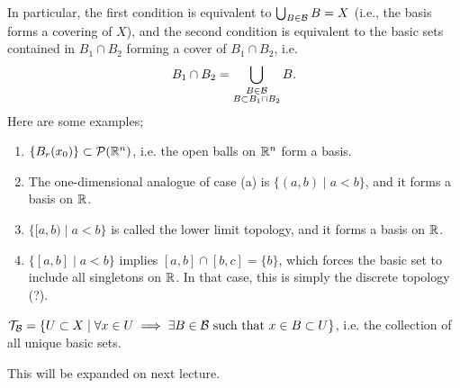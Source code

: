 \newpage
\noindent In particular, the first condition is equivalent to $\bigcup_{B \in \mathcal B} B = X$ (i.e., the basis forms a covering of $X$), and the second condition is equivalent to the basic sets contained in $B_1 \cap B_2$ forming a cover of $B_1 \cap B_2$, i.e.
\[ B_1 \cap B_2 = \bigcup_{\substack{B \in \mathcal B \\ B \subset B_1 \cap B_2}} B. \]
Here are some examples;
\begin{enumerate}[label=(\alph*)]
    \item $\{B_r(x_0)\} \subset \mathcal P(\mathbb R^n)$, i.e. the open balls on $\mathbb R^n$ form a basis.
    \item The one-dimensional analogue of case (a) is $\{(a, b) \mid a < b\}$, and it forms a basis on $\mathbb R$.
    \item $\{[a, b) \mid a < b\}$ is called the lower limit topology, and it forms a basis on $\mathbb R$.
    \item $\{[a, b] \mid a < b\}$ implies $[a, b] \cap [b, c] = \{b\}$, which forces the basic set to include all singletons on $\mathbb R$. In that case, this is simply the discrete topology (?).
\end{enumerate}
\begin{simplethm}
    $\mathcal T_\mathcal B = \{ U \subset X \mid \forall x \in U \implies \exists B \in \mathcal B \text{ such that } x \in B \subset U\}$, i.e. the collection of all unique basic sets.
\end{simplethm}
This will be expanded on next lecture.